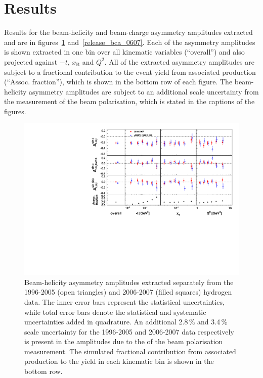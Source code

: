 \section{Results}
Results for the beam-helicity and beam-charge asymmetry amplitudes extracted 
 and  are  in figures~\ref{release_bsa_0607} and~\ref{release_bca_0607}. Each of the asymmetry amplitudes is shown extracted in one bin over all kinematic variables (``overall'') and also projected against $-t$, $x_{\textrm{B}}$ and $Q^{2}$. All of the extracted asymmetry amplitudes are subject to a fractional contribution to the event yield from associated production (``Assoc. fraction''), which is shown in the bottom row of each figure. The beam-helicity asymmetry amplitudes are subject to an additional scale uncertainty from the measurement of the beam polarisation, which is stated in the captions of the figures.
\begin{figure}
\begin{center}
\includegraphics[width=15cm,keepaspectratio]{bsadvcsplots_eml_par13_bin6_pic_0607_9605_cluster_dual}
  \caption{Beam-helicity asymmetry amplitudes extracted separately from
the 1996-2005 (open triangles) and 2006-2007 (filled squares)
hydrogen data. The inner error bars represent the statistical uncertainties, while total error bars denote the statistical and systematic uncertainties added in quadrature.  
An additional 2.8\,\% and 3.4\,\% scale uncertainty for the 1996-2005 and
2006-2007 data respectively is present in the amplitudes due to the  of
the beam polarisation measurement. The simulated fractional contribution from associated production to the yield in each kinematic bin is shown in the bottom row.}
 \label{release_bsa_0607}
\end{center}
 \end{figure}

